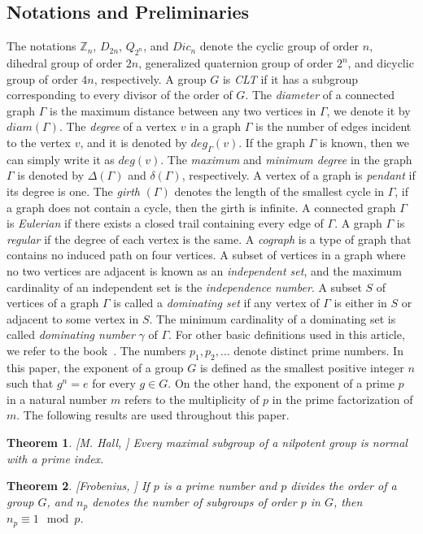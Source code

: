 \documentclass[11pt,twoside]{amsart}
\def \Z {{\mathbb{Z}}}
\newtheorem{theorem}{Theorem}[section]
\begin{document}
\subsection{Notations and Preliminaries}
The notations $\Z_n$, $D_{2n}$, $Q_{2^n}$, and $Dic_{n}$ denote the cyclic group of order $n$, dihedral group of order $2n$, generalized quaternion group of order $2^n$, and dicyclic group of order $4n$, respectively. A group $G$ is {\em CLT} if it has a subgroup corresponding to every divisor of the order of $G$. The {\em diameter} of a connected graph $\Gamma$ is the maximum distance between any two vertices in $\Gamma$, we denote it by $diam (\Gamma)$. The {\em degree} of a vertex $v$ in a graph $\Gamma$ is the number of edges incident to the vertex $v$, and it is denoted by $deg_{\Gamma}(v)$. If the graph $\Gamma$ is known, then we can simply write it as $deg (v)$. The {\em maximum} and {\em minimum degree} in the graph $\Gamma$ is denoted by $\Delta (\Gamma)$ and $\delta (\Gamma)$, respectively. A vertex of a graph is {\em pendant} if its degree is one. The {\em girth} $(\Gamma)$ denotes the length of the smallest cycle in $\Gamma$, if a graph does not contain a cycle, then the girth is infinite. A connected graph $\Gamma$ is {\em Eulerian} if there exists a closed trail containing every edge of $\Gamma$. A graph $\Gamma$ is {\em regular} if the degree of each vertex is the same. A {\em cograph} is a type of graph that contains no induced path on four vertices. A subset of vertices in a graph where no two vertices are adjacent is known as an {\em independent set}, and the maximum cardinality of an independent set is the {\em independence number}. A subset $S$ of vertices of a graph $\Gamma$ is called a {\em dominating set} if any vertex of $\Gamma$ is either in $S$ or adjacent to some vertex in $S$. The minimum cardinality of a dominating set is called {\em dominating number} $\gamma$ of $\Gamma$. For other basic definitions used in this article, we refer to the book~\cite{west2001introduction}. The numbers $p_1,p_2,\ldots$ denote distinct prime numbers. In this paper, the exponent of a group $G$ is defined as the smallest positive integer $n$ such that $g^n=e$ for every $g\in G$. On the other hand, the exponent of a prime $p$ in a natural number $m$ refers to the multiplicity of $p$ in the prime factorization of $m$. The following results are used throughout this paper.
\begin{theorem}\label{maximal}[{M. Hall, \cite{hall2018theory}}]
 Every maximal subgroup of a nilpotent group is normal with a prime index.   
\end{theorem}
\begin{theorem}\label{sylowspecial}[{Frobenius, \cite{brown1988generalization}}] If $p$ is a prime number and $p$ divides the order of a group $G$, and $n_p$ denotes the number of subgroups of order $p$ in $G$, then $n_p\equiv 1 \mod p$.
\end{theorem}
\end{document}
